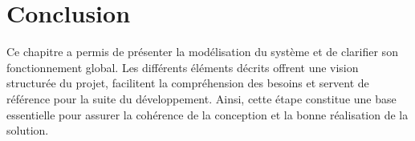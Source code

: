 \section{Conclusion}

Ce chapitre a permis de présenter la modélisation du système et de clarifier son fonctionnement global. Les différents éléments décrits offrent une vision structurée du projet, facilitent la compréhension des besoins et servent de référence pour la suite du développement. Ainsi, cette étape constitue une base essentielle pour assurer la cohérence de la conception et la bonne réalisation de la solution.
